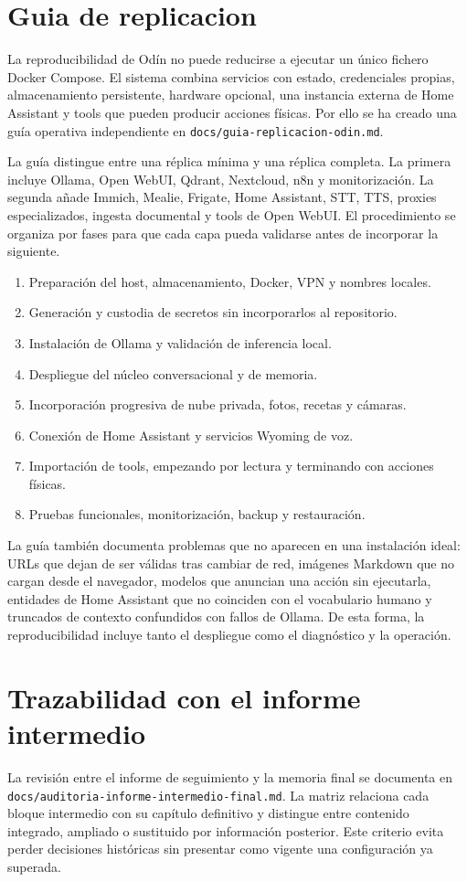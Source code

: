 \section{Guia de replicacion}
La reproducibilidad de Odín no puede reducirse a ejecutar un único fichero
Docker Compose. El sistema combina servicios con estado, credenciales propias,
almacenamiento persistente, hardware opcional, una instancia externa de Home
Assistant y tools que pueden producir acciones físicas. Por ello se ha creado
una guía operativa independiente en
\nolinkurl{docs/guia-replicacion-odin.md}.

La guía distingue entre una réplica mínima y una réplica completa. La primera
incluye Ollama, Open WebUI, Qdrant, Nextcloud, n8n y monitorización. La segunda
añade Immich, Mealie, Frigate, Home Assistant, STT, TTS, proxies especializados,
ingesta documental y tools de Open WebUI. El procedimiento se organiza por
fases para que cada capa pueda validarse antes de incorporar la siguiente.

\begin{enumerate}
  \item Preparación del host, almacenamiento, Docker, VPN y nombres locales.
  \item Generación y custodia de secretos sin incorporarlos al repositorio.
  \item Instalación de Ollama y validación de inferencia local.
  \item Despliegue del núcleo conversacional y de memoria.
  \item Incorporación progresiva de nube privada, fotos, recetas y cámaras.
  \item Conexión de Home Assistant y servicios Wyoming de voz.
  \item Importación de tools, empezando por lectura y terminando con acciones físicas.
  \item Pruebas funcionales, monitorización, backup y restauración.
\end{enumerate}

La guía también documenta problemas que no aparecen en una instalación ideal:
URLs que dejan de ser válidas tras cambiar de red, imágenes Markdown que no
cargan desde el navegador, modelos que anuncian una acción sin ejecutarla,
entidades de Home Assistant que no coinciden con el vocabulario humano y
truncados de contexto confundidos con fallos de Ollama. De esta forma, la
reproducibilidad incluye tanto el despliegue como el diagnóstico y la operación.

\section{Trazabilidad con el informe intermedio}
La revisión entre el informe de seguimiento y la memoria final se documenta en
\nolinkurl{docs/auditoria-informe-intermedio-final.md}. La matriz relaciona cada
bloque intermedio con su capítulo definitivo y distingue entre contenido
integrado, ampliado o sustituido por información posterior. Este criterio evita
perder decisiones históricas sin presentar como vigente una configuración ya
superada.
